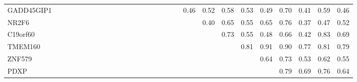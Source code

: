 \begin{longtable}{lrrrrrrrrrrrrrrrrrrrrrrrrrrr}
GADD45GIP1    &               &            &             &              &            &               &             &               &              &             &              &             &             &               &                     &              &                &                  &        0.46 &           0.52 &          0.58 &         0.53 &       0.49 &         0.70 &           0.41 &            0.59 &          0.46 \\
NR2F6         &               &            &             &              &            &               &             &               &              &             &              &             &             &               &                     &              &                &                  &             &           0.40 &          0.65 &         0.55 &       0.65 &         0.76 &           0.37 &            0.47 &          0.52 \\
C19orf60      &               &            &             &              &            &               &             &               &              &             &              &             &             &               &                     &              &                &                  &             &                &          0.73 &         0.55 &       0.48 &         0.66 &           0.42 &            0.83 &          0.69 \\
TMEM160       &               &            &             &              &            &               &             &               &              &             &              &             &             &               &                     &              &                &                  &             &                &               &         0.81 &       0.91 &         0.90 &           0.77 &            0.81 &          0.79 \\
ZNF579        &               &            &             &              &            &               &             &               &              &             &              &             &             &               &                     &              &                &                  &             &                &               &              &       0.64 &         0.73 &           0.53 &            0.62 &          0.55 \\
PDXP          &               &            &             &              &            &               &             &               &              &             &              &             &             &               &                     &              &                &                  &             &                &               &              &            &         0.79 &           0.69 &            0.76 &          0.64 \\

\end{longtable}
